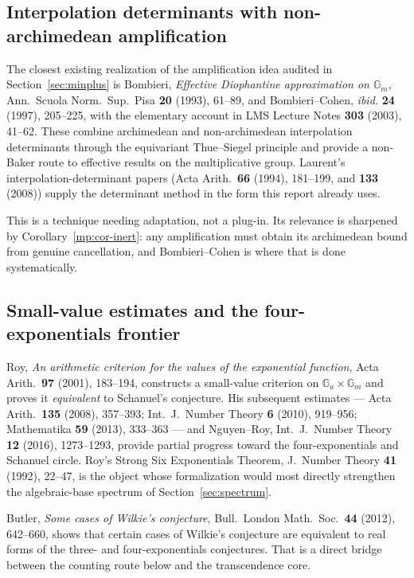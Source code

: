 \documentclass[11pt,oneside]{article}
\theoremstyle{definition}
\theoremstyle{remark}
\begin{document}
\subsection{Interpolation determinants with non-archimedean amplification}

The closest existing realization of the amplification idea audited in
Section~\ref{sec:minplus} is Bombieri, \emph{Effective Diophantine approximation on
$\mathbb G_m$}, Ann.\ Scuola Norm.\ Sup.\ Pisa \textbf{20} (1993), 61--89, and Bombieri--Cohen,
\emph{ibid.} \textbf{24} (1997), 205--225, with the elementary account in LMS Lecture Notes
\textbf{303} (2003), 41--62.  These combine archimedean and non-archimedean interpolation
determinants through the equivariant Thue--Siegel principle and provide a non-Baker route to
effective results on the multiplicative group.  Laurent's interpolation-determinant papers
(Acta Arith.\ \textbf{66} (1994), 181--199, and \textbf{133} (2008)) supply the determinant
method in the form this report already uses.

This is a technique needing adaptation, not a plug-in.  Its relevance is sharpened by
Corollary~\ref{mp:cor-inert}: any amplification must obtain its archimedean bound from genuine
cancellation, and Bombieri--Cohen is where that is done systematically.

\subsection{Small-value estimates and the four-exponentials frontier}

Roy, \emph{An arithmetic criterion for the values of the exponential function}, Acta Arith.\
\textbf{97} (2001), 183--194, constructs a small-value criterion on
$\mathbb G_a\times\mathbb G_m$ and proves it \emph{equivalent} to Schanuel's conjecture.  His
subsequent estimates --- Acta Arith.\ \textbf{135} (2008), 357--393; Int.\ J.\ Number Theory
\textbf{6} (2010), 919--956; Mathematika \textbf{59} (2013), 333--363 --- and Nguyen--Roy, Int.\
J.\ Number Theory \textbf{12} (2016), 1273--1293, provide partial progress toward the
four-exponentials and Schanuel circle.  Roy's Strong Six Exponentials Theorem, J.\ Number
Theory \textbf{41} (1992), 22--47, is the object whose formalization would most directly
strengthen the algebraic-base spectrum of Section~\ref{sec:spectrum}.

Butler, \emph{Some cases of Wilkie's conjecture}, Bull.\ London Math.\ Soc.\ \textbf{44}
(2012), 642--660, shows that certain cases of Wilkie's conjecture are equivalent to real forms
of the three- and four-exponentials conjectures.  That is a direct bridge between the counting
route below and the transcendence core.
\end{document}
